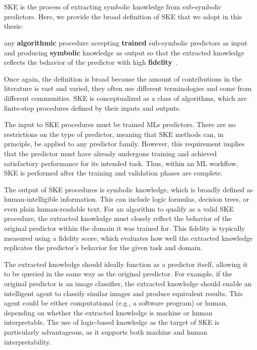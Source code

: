 \section[Symbolic knowledge extraction]{}\label{sec:ske}
%
\gls{SKE} is the process of extracting symbolic knowledge from sub-symbolic predictors.
%
Here, we provide the broad definition of \gls{SKE} that we adopt in this thesis:
%
\begin{definition}
    \label{def:ske}
    any \textbf{algorithmic} procedure accepting \textbf{trained} sub-symbolic predictors as input and producing \textbf{symbolic} knowledge as output so that the extracted knowledge reflects the behavior of the predictor with high \textbf{fidelity}~\cite{DBLP:journals/csur/CiattoSAMO24}.
\end{definition}
%
Once again, the definition is broad because the amount of contributions in the literature is vast and varied, they often use different terminologies and come from different communities.
%
\Gls{SKE} is conceptualized as a class of algorithms, which are finite-step procedures defined by their inputs and outputs.

The input to \gls{SKE} procedures must be trained \glspl{ML} predictors.
%
There are no restrictions on the type of predictor, meaning that \gls{SKE} methods can, in principle, be applied to any predictor family.
%
However, this requirement implies that the predictor must have already undergone training and achieved satisfactory performance for its intended task.
%
Thus, within an \gls{ML} workflow, \gls{SKE} is performed after the training and validation phases are complete.

The output of \gls{SKE} procedures is symbolic knowledge, which is broadly defined as human-intelligible information.
%
This can include logic formulas, decision trees, or even plain human-readable text.
%
For an algorithm to qualify as a valid \gls{SKE} procedure, the extracted knowledge must closely reflect the behavior of the original predictor within the domain it was trained for.
%
This fidelity is typically measured using a fidelity score, which evaluates how well the extracted knowledge replicates the predictor's behavior for the given task and domain.

The extracted knowledge should ideally function as a predictor itself, allowing it to be queried in the same way as the original predictor.
%
For example, if the original predictor is an image classifier, the extracted knowledge should enable an intelligent agent to classify similar images and produce equivalent results.
%
This agent could be either computational (e.g., a software program) or human, depending on whether the extracted knowledge is machine or human interpretable.
%
The use of logic-based knowledge as the target of \gls{SKE} is particularly advantageous, as it supports both machine and human interpretability.


